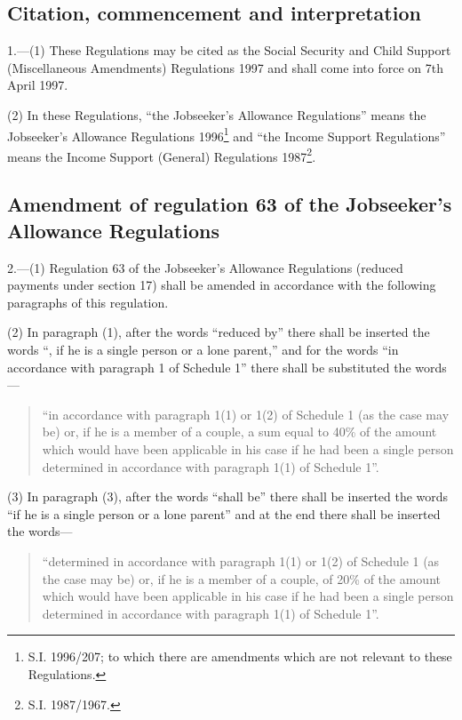 \documentclass[12pt,a4paper]{article}
\begin{document}
\bigskip

\setcounter{secnumdepth}{-2}

\subsection[1. Citation, commencement and interpretation]{Citation, commencement and interpretation}

1.—(1) These Regulations may be cited as the Social Security and Child Support (Miscellaneous Amendments) Regulations 1997 and shall come into force on 7th April 1997.

(2) In these Regulations, “the Jobseeker’s Allowance Regulations” means the Jobseeker’s Allowance Regulations 1996\footnote{\frenchspacing S.I. 1996/207; to which there are amendments which are not relevant to these Regulations.} and “the Income Support Regulations” means the Income Support (General) Regulations 1987\footnote{\frenchspacing S.I. 1987/1967.}.

\subsection[2. Amendment of regulation 63 of the Jobseeker’s Allowance Regulations]{Amendment of regulation 63 of the Jobseeker’s Allowance Regulations}

2.—(1) Regulation 63 of the Jobseeker’s Allowance Regulations (reduced payments under section 17) shall be amended in accordance with the following paragraphs of this regulation.

(2) In paragraph (1), after the words “reduced by” there shall be inserted the words “, if he is a single person or a lone parent,” and for the words “in accordance with paragraph 1 of Schedule 1” there shall be substituted the words—
\begin{quotation}
“in accordance with paragraph 1(1) or 1(2) of Schedule 1 (as the case may be) or, if he is a member of a couple, a sum equal to 40\% of the amount which would have been applicable in his case if he had been a single person determined in accordance with paragraph 1(1) of Schedule 1”.
\end{quotation}

(3) In paragraph (3), after the words “shall be” there shall be inserted the words “if he is a single person or a lone parent” and at the end there shall be inserted the words—
\begin{quotation}
“determined in accordance with paragraph 1(1) or 1(2) of Schedule 1 (as the case may be) or, if he is a member of a couple, of 20\% of the amount which would have been applicable in his case if he had been a single person determined in accordance with paragraph 1(1) of Schedule 1”.
\end{quotation}
\end{document}
